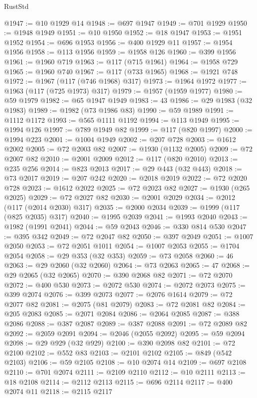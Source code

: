 \begin{lexlean}{RustStd}
\begin{coremodule}
{\begin{coremodule}
{{{{{{{{{{{{{{{{{{{{{{{{{{{{{{{{{{{{{{{{{{{{{{{{{{{{{{{@1947 := @10 @1929 @14
@1948 := @697 @1947
@1949 := @701 @1929
@1950 := @1948 @1949
@1951 := @10 @1950
@1952 := @18 @1947
@1953 := @1951 @1952
@1954 := @696 @1953
@1956 := @400 @1929 @11
@1957 := @1954 @1956
@1958 := @113 @1956
@1959 := @1958 @126
@1960 := @399 @1956
@1961 := @1960 @719
@1963 := @117 (@715 @1961)
@1964 := @1958 @729
@1965 := @1960 @740
@1967 := @117 (@733 @1965)
@1968 := @1921 @748
@1972 := @1967 (@117 (@746 @1968) @317)
@1973 := @1964 @1972
@1977 := @1963 (@117 (@725 @1973) @317)
@1979 := @1957 (@1959 @1977)
@1980 := @59 @1979
@1982 := @65 @1947 @1949
@1983 := 43
@1986 := @29 @1983 (@32 @1983)
@1989 := @1982 (@73 @1986 @83)
@1990 := @59 @1989
@1991 := @1112 @1172
@1993 := @565 @1111 @1192
@1994 := @113 @1949
@1995 := @1994 @126
@1997 := @789 @1949 @82
@1999 := @117 (@820 @1997)
@2000 := @1994 @223
@2001 := @1004 @1949
@2002 := @207 @728
@2003 := @1612 @2002
@2005 := @72 @2003 @82
@2007 := @1930 (@1132 @2005)
@2009 := @72 @2007 @82
@2010 := @2001 @2009
@2012 := @117 (@820 @2010)
@2013 := @235 @256
@2014 := @823 @2013
@2017 := @29 @443 (@32 @443)
@2018 := @73 @2017
@2019 := @207 @242
@2020 := @2018 @2019
@2022 := @72 @2020 @728
@2023 := @1612 @2022
@2025 := @72 @2023 @82
@2027 := @1930 (@265 @2025)
@2029 := @72 @2027 @82
@2030 := @2001 @2029
@2034 := @2012 (@117 (@2014 @2030) @317)
@2035 := @2000 @2034
@2039 := @1999 (@117 (@825 @2035) @317)
@2040 := @1995 @2039
@2041 := @1993 @2040
@2043 := @1982 (@1991 @2041)
@2044 := @59 @2043
@2046 := @330 @814 @530
@2047 := @395 @342
@2049 := @72 @2047 @82
@2050 := @397 @2049
@2051 := @1007 @2050
@2053 := @72 @2051 @1011
@2054 := @1007 @2053
@2055 := @1704 @2054
@2058 := @29 @353 (@32 @353)
@2059 := @73 @2058
@2060 := 46
@2063 := @29 @2060 (@32 @2060)
@2064 := @73 @2063
@2065 := 47
@2068 := @29 @2065 (@32 @2065)
@2070 := @390 @2068 @82
@2071 := @72 @2070
@2072 := @400 @530
@2073 := @2072 @530
@2074 := @2072 @2073
@2075 := @399 @2074
@2076 := @399 @2073
@2077 := @2076 @1614
@2079 := @72 @2077 @82
@2081 := @2075 (@81 @2079)
@2083 := @72 @2081 @82
@2084 := @205 @2083
@2085 := @2071 @2084
@2086 := @2064 @2085
@2087 := @388 @2086
@2088 := @387 @2087
@2089 := @387 @2088
@2091 := @72 @2089 @82
@2092 := @2059 @2091
@2094 := @2046 (@2055 @2092)
@2095 := @59 @2094
@2098 := @29 @929 (@32 @929)
@2100 := @390 @2098 @82
@2101 := @72 @2100
@2102 := @552 @83
@2103 := @2101 @2102
@2105 := @849 (@542 @2103)
@2106 := @59 @2105
@2108 := @10 @2074 @14
@2109 := @697 @2108
@2110 := @701 @2074
@2111 := @2109 @2110
@2112 := @10 @2111
@2113 := @18 @2108
@2114 := @2112 @2113
@2115 := @696 @2114
@2117 := @400 @2074 @11
@2118 := @2115 @2117
}}}}}}}}}}}}}}}}}}}}}}}}}}}}}}}}}}}}}}}}}}}}}}}}}}}}}}}
\end{coremodule}}
\end{coremodule}
\end{lexlean}
